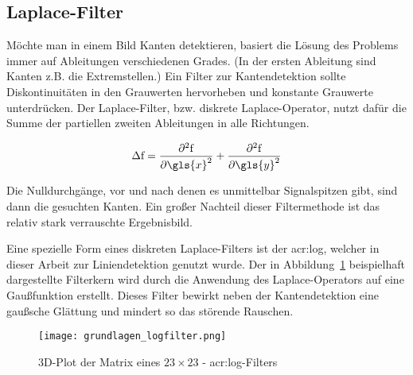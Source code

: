 \subsection{Laplace-Filter} \label{ssec:laplaceFilter}

Möchte man in einem Bild Kanten detektieren, basiert die Lösung des Problems immer auf Ableitungen verschiedenen Grades. (In der ersten Ableitung sind Kanten z.B. die Extremstellen.) Ein Filter zur Kantendetektion sollte Diskontinuitäten in den Grauwerten hervorheben und konstante Grauwerte unterdrücken. Der Laplace-Filter, bzw. diskrete Laplace-Operator, nutzt dafür die Summe der partiellen zweiten Ableitungen in alle Richtungen. \autocite{jaehneDigitaleBildverarbeitungMit2005}

\begin{equation}
\Delta \mathrm{f} = \frac{\partial^2 \mathrm{f}}{\partial {\gls{x}}^2} + \frac{\partial^2 \mathrm{f}}{\partial {\gls{y}}^2}
\end{equation}

Die Nulldurchgänge, vor und nach denen es unmittelbar Signalspitzen gibt, sind dann die gesuchten Kanten. Ein großer Nachteil dieser Filtermethode ist das relativ stark verrauschte Ergebnisbild.

Eine spezielle Form eines diskreten Laplace-Filters ist der \gls{acr:log}, welcher in dieser Arbeit zur Liniendetektion genutzt wurde. Der in Abbildung~\ref{fig:grundlagen_logfilter} beispielhaft dargestellte Filterkern wird durch die Anwendung des Laplace-Operators auf eine Gaußfunktion erstellt. Dieses Filter bewirkt neben der Kantendetektion eine gaußsche Glättung und mindert so das störende Rauschen.

\begin{figure}[H] %
  \centering
  \texttt{[image: grundlagen\_logfilter.png]}
  \caption{3D-Plot der Matrix eines \( 23\times23\) - \gls{acr:log}-Filters}
  \label{fig:grundlagen_logfilter}
\end{figure}  

